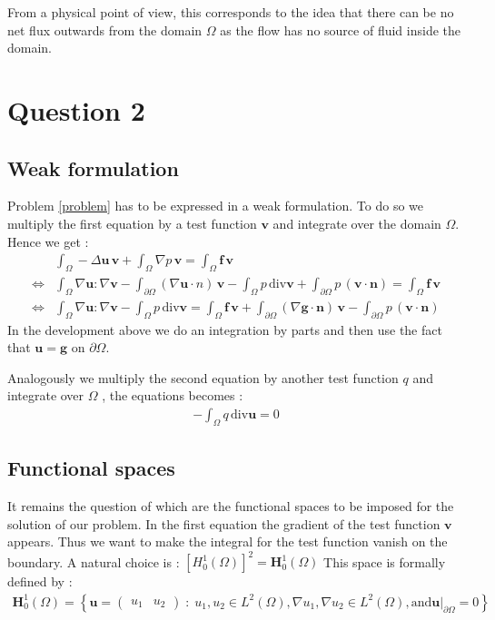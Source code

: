 \documentclass{article}
\begin{document}
From a physical point of view, this corresponds to the idea that there can be no
net flux outwards from the domain $\Omega$ as the flow has no source of fluid
inside the domain.

\section*{Question 2}
\subsection*{Weak formulation}
Problem \ref{problem} has to be expressed in a weak formulation. To do so we
multiply the first equation by a test function $\mathbf{v}$ and integrate over
the domain $\Omega$. Hence we get :
\begin{align*}
	& \int_{\Omega}-\Delta \mathbf{u} \,\mathbf{v}+\int_{\Omega}\nabla p \,\mathbf{v} = \int_{\Omega}\mathbf{f}\, \mathbf{v} \\
	\Leftrightarrow& \int_{\Omega} \nabla \mathbf{u} \mathbf{:} \nabla \mathbf{v}-\int_{\partial\Omega} (\nabla \mathbf{u}\cdot n)\, \mathbf{v}  -\int_{\Omega} p\, \mathrm{div}\mathbf{v}+\int_{\partial\Omega}p\,(\mathbf{v}\cdot \mathbf{n})=\int_{\Omega}\mathbf{f}\, \mathbf{v} \\
	\Leftrightarrow& \int_{\Omega} \nabla \mathbf{u} \mathbf{:} \nabla \mathbf{v}-\int_{\Omega} p\, \mathrm{div}\mathbf{v} = \int_{\Omega}\mathbf{f}\, \mathbf{v}+\int_{\partial\Omega} (\nabla \mathbf{g}\cdot \mathbf{n})\, \mathbf{v}-\int_{\partial\Omega}p\,(\mathbf{v}\cdot \mathbf{n})   
\end{align*}
In the development above we do an integration by parts and then use the fact
that $\mathbf{u}=\mathbf{g} \textrm{ on } \partial\Omega$.

Analogously we multiply the second equation by another test function
$q$ and integrate over $\Omega$ , the
equations becomes :
\begin{align*}
    -\int_{\Omega} q\, \mathrm{div}\mathbf{u} = 0
\end{align*}

\subsection*{Functional spaces}
It remains the question of which are the functional spaces to be imposed for
the solution of our problem. In the first equation the gradient of the test
function $\mathbf{v}$ appears. Thus we want to make the integral for the test
function vanish on the boundary. A natural choice is :
$[H^1_0(\Omega)]^2 = \mathbf{H}^1_0(\Omega)$
This space is formally defined by :  
\begin{align*}
	\mathbf{H}^1_0(\Omega) = \left\{\mathbf{u}=\begin{pmatrix} u_1 & u_2 \end{pmatrix} \;:\; u_1, u_2 \in L^2(\Omega),
	\nabla u_1, \nabla u_2 \in L^2(\Omega), \textrm{and}
	\mathbf{u}|_{\partial\Omega}=0 \right\}
\end{align*}
\end{document}
